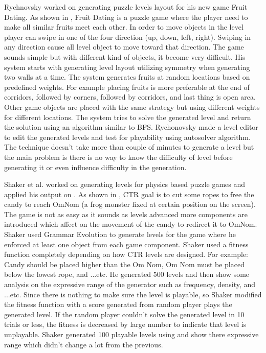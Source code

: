 Rychnovsky worked on generating puzzle levels layout for his new game Fruit Dating\cite{fruitDating}. As shown in , Fruit Dating is a puzzle game where the player need to make all similar fruits meet each other. In order to move objects in the level player can swipe in one of the four direction (up, down, left, right). Swiping in any direction cause all level object to move toward that direction. The game sounds simple but with different kind of objects, it become very difficult. His system starts with generating level layout utilizing symmetry when generating two walls at a time. The system generates fruits at random locations based on predefined weights. For example placing fruits is more preferable at the end of corridors, followed by corners, followed by corridors, and last thing is open area. Other game objects are placed with the same strategy but using different weights for different locations. The system tries to solve the generated level and return the solution using an algorithm similar to BFS. Rychonovsky made a level editor to edit the generated levels and test for playability using autosolver algorithm. The technique doesn't take more than couple of minutes to generate a level but the main problem is there is no way to know the difficulty of level before generating it or even influence difficulty in the generation.


Shaker et al.\cite{ctrAutomaticGeneration} worked on generating levels for physics based puzzle games and applied his output on . As shown in , CTR goal is to cut some ropes to free the candy to reach OmNom (a frog monster fixed at certain position on the screen). The game is not as easy as it sounds as levels advanced more components are introduced which affect on the movement of the candy to redirect it to OmNom. Shaker used Grammar Evolution to generate levels for the game where he enforced at least one object from each game component. Shaker used a fitness function completely depending on how CTR levels are designed. For example: Candy should be placed higher than the Om Nom, Om Nom must be placed below the lowest rope, and ...etc. He generated 500 levels and then show some analysis on the expressive range of the generator such as frequency, density, and ...etc. Since there is nothing to make sure the level is playable, so Shaker modified the fitness function with a score generated from random player plays the generated level. If the random player couldn't solve the generated level in 10 trials or less, the fitness is decreased by large number to indicate that level is unplayable. Shaker generated 100 playable levels using and show there expressive range which didn't change a lot from the previous.\\\par

